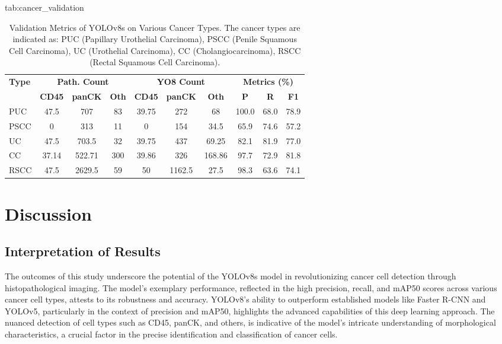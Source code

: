 \documentclass[anon]{midl} %
\begin{document}
\begin{table}[htbp]
\floatconts
  {tab:cancer_validation}%
  {\caption{Validation Metrics of YOLOv8s on Various Cancer Types. The cancer types are indicated as: PUC (Papillary Urothelial Carcinoma), PSCC (Penile Squamous Cell Carcinoma), UC (Urothelial Carcinoma), CC (Cholangiocarcinoma), RSCC (Rectal Squamous Cell Carcinoma).}}%
  {\begin{tabular}{l|ccc|ccc|ccc}
  \bfseries Type & \multicolumn{3}{c|}{\bfseries Path. Count} & \multicolumn{3}{c|}{\bfseries YO8 Count} & \multicolumn{3}{c}{\bfseries Metrics (\%)}\\
  & \bfseries CD45 & \bfseries panCK & \bfseries Oth & \bfseries CD45 & \bfseries panCK & \bfseries Oth & \bfseries P & \bfseries R & \bfseries F1\\
  PUC & 47.5 & 707 & 83 & 39.75 & 272 & 68 & 100.0 & 68.0 & 78.9\\
  PSCC & 0 & 313 & 11 & 0 & 154 & 34.5 & 65.9 & 74.6 & 57.2\\
  UC & 47.5 & 703.5 & 32 & 39.75 & 437 & 69.25 & 82.1 & 81.9 & 77.0\\
  CC & 37.14 & 522.71 & 300 & 39.86 & 326 & 168.86 & 97.7 & 72.9 & 81.8\\
  RSCC & 47.5 & 2629.5 & 59 & 50 & 1162.5 & 27.5 & 98.3 & 63.6 & 74.1
  \end{tabular}}
\end{table}


\section{Discussion}

\subsection{Interpretation of Results}
The outcomes of this study underscore the potential of the YOLOv8s model in revolutionizing cancer cell detection through histopathological imaging. The model's exemplary performance, reflected in the high precision, recall, and mAP50 scores across various cancer cell types, attests to its robustness and accuracy. YOLOv8's ability to outperform established models like Faster R-CNN and YOLOv5, particularly in the context of precision and mAP50, highlights the advanced capabilities of this deep learning approach. The nuanced detection of cell types such as CD45, panCK, and others, is indicative of the model's intricate understanding of morphological characteristics, a crucial factor in the precise identification and classification of cancer cells.
\end{document}
